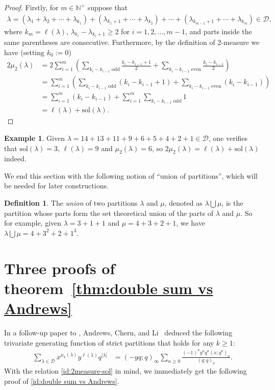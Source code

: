 \documentclass[11pt,reqno]{amsart}
\numberwithin{equation}{section}
\theoremstyle{plain}
\theoremstyle{definition}
\newtheorem{Def}[theorem]{Definition}
\newtheorem{example}[theorem]{Example}
\theoremstyle{named}
\def\cD{\mathcal{D}}
\def\bN{\mathbb{N}}
\def\la{\lambda}
\def\sol{\mathrm{sol}}
\begin{document}
\begin{proof}
Firstly, for $m\in \bN^+$ suppose that
\begin{align*}
\la=(\la_{1}+\la_{2}+\cdots +\la_{k_{1}})+(\la_{k_{1}+1}+\cdots +\la_{k_{2}})+\cdots +(\la_{k_{m-1}+1}+\cdots +\la_{k_{m}})\in \cD,
\end{align*}
where $k_m=\ell(\la)$, $\la_{k_{i}}-\la_{k_{i}+1}\ge 2$ for $i=1, 2, \ldots, m-1$, and parts inside the same parentheses are consecutive. Furthermore, by the definition of $2$-measure we have (setting $k_0:=0$)
\begin{align*}
2\mu_{2}(\la)&=2\sum_{i=1}^{m}\left(\sum_{\scriptscriptstyle k_{i}-k_{i-1}\text{ odd}}\frac{k_{i}-k_{i-1}+1}{2}+\sum_{\scriptscriptstyle k_{i}-k_{i-1}\text{ even}}\frac{k_{i}-k_{i-1}}{2}\right)\\
&=\sum_{i=1}^{m}\left(\sum_{\scriptscriptstyle k_{i}-k_{i-1}\text{ odd}}(k_{i}-k_{i-1}+1)+\sum_{\scriptscriptstyle k_{i}-k_{i-1}\text{ even}}(k_{i}-k_{i-1})\right)\\
&=\sum_{i=1}^{m}(k_{i}-k_{i-1})+\sum_{i=1}^{m}\sum\limits_{\scriptscriptstyle\text{$k_i-k_{i-1}$ odd}} 1\\
&=\ell(\la)+\sol(\la).
\end{align*}
\end{proof}

\begin{example}
Given $\la=14+13+11+9+6+5+4+2+1\in \cD$, one verifies that $\sol(\la)=3$, $\ell(\la)=9$ and $\mu_{2}(\la)=6$, so $2\mu_{2}(\la)=\ell(\la)+\sol(\la)$ indeed.
\end{example}

We end this section with the following notion of ``union of partitions'', which will be needed for later constructions.
\begin{Def}\label{def:union}
The {\it union} of two partitions $\la$ and $\mu$, denoted as $\la\bigcup\mu$, is the partition whose parts form the set theoretical union of the parts of $\la$ and $\mu$. So for example, given $\la=3+1+1$ and $\mu=4+3+2+1$, we have $\la\bigcup\mu=4+3^2+2+1^3$.
\end{Def} 




\section{\texorpdfstring{Three proofs of theorem~\ref{thm:double sum vs Andrews}}{Three proofs of Theorem 1.1}}\label{sec:3pf}
In a follow-up paper to \cite{ABD22}, Andrews, Chern, and Li~\cite{ACL22} deduced the following trivariate generating function of strict partitions that holds for any $k\ge 1$:
\begin{align}\label{gf:k-measure}
\sum_{\la\in\cD}x^{\mu_{k}(\la)}y^{\ell(\la)}q^{|\la|} &=(-yq; q)_{\infty}\sum_{n\geq 0}\frac{(-1)^ny^nq^n(x; q^{k})_{n}}{(q; q)_{n}}.
\end{align}
With the relation \eqref{id:2measure-sol} in mind, we immediately get the following proof of \eqref{id:double sum vs Andrews}.
\end{document}
